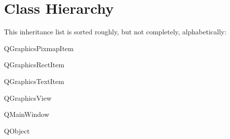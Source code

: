 \section{Class Hierarchy}
This inheritance list is sorted roughly, but not completely, alphabetically\+:\begin{DoxyCompactList}
\item Q\+Graphics\+Pixmap\+Item\begin{DoxyCompactList}
\item {}
\item {}
\item {}
\end{DoxyCompactList}
\item Q\+Graphics\+Rect\+Item\begin{DoxyCompactList}
\item {}
\end{DoxyCompactList}
\item Q\+Graphics\+Text\+Item\begin{DoxyCompactList}
\item {}
\end{DoxyCompactList}
\item Q\+Graphics\+View\begin{DoxyCompactList}
\item {}
\end{DoxyCompactList}
\item Q\+Main\+Window\begin{DoxyCompactList}
\item {}
\end{DoxyCompactList}
\item Q\+Object\begin{DoxyCompactList}
\item {}
\item {}
\item {}
\item {}
\item {}
\end{DoxyCompactList}
\end{DoxyCompactList}
